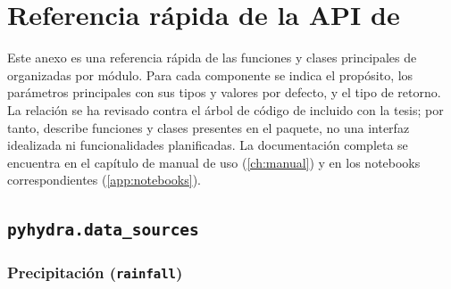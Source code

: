 \chapter{Referencia rápida de la API de \pyhydra}
\label{app:api}

Este anexo es una referencia rápida de las funciones y clases principales de \pyhydra organizadas por módulo. Para cada componente se indica el propósito, los parámetros principales con sus tipos y valores por defecto, y el tipo de retorno. La relación se ha revisado contra el árbol de código de \pyhydra incluido con la tesis; por tanto, describe funciones y clases presentes en el paquete, no una interfaz idealizada ni funcionalidades planificadas. La documentación completa se encuentra en el capítulo de manual de uso (\cref{ch:manual}) y en los notebooks correspondientes (\cref{app:notebooks}).

\newcommand{\apisig}[1]{%
  \begingroup
  \setlength{\fboxsep}{3pt}%
  \colorbox{codebg}{\parbox{0.96\linewidth}{\raggedright\ttfamily\footnotesize #1}}%
  \endgroup
}

\section{\texttt{pyhydra.data\_sources}}

\subsection{Precipitación (\texttt{rainfall})}

